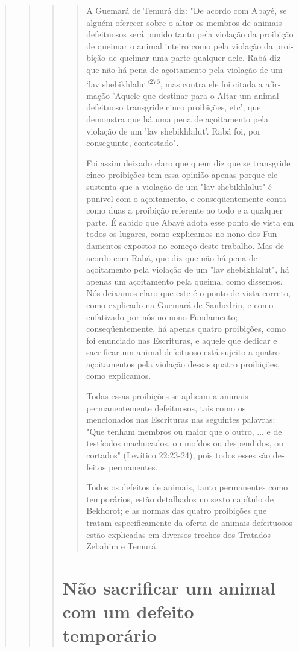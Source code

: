 \begin{quote}
\begin{quote}
\begin{quote}
\begin{quote}
A Guemará de Temurá diz: "De acordo com Abayé, se alguém ofe­recer sobre
o altar os membros de animais defeituosos será punido tanto pela
violação da proibição de queimar o animal inteiro como pela violação da
proi­bição de queimar uma parte qualquer dele. Rabá diz que não há pena
de açoita­mento pela violação de um `lav
shebikhlalut'\textsuperscript{276}, mas contra ele foi citada a
afir­mação 'Aquele que destinar para o Altar um animal defeituoso
transgride cinco proibições, etc', que demonstra que há uma pena de
açoitamento pela violação de um 'lav shebikhlalut'. Rabá foi, por
conseguinte, contestado".

Foi assim deixado claro que quem diz que se transgride cinco proi­bições
tem essa opinião apenas porque ele sustenta que a violação de um "lav
shebikhlalut" é punível com o açoitamento, e conseqüentemente conta como
duas a proibição referente ao todo e a qualquer parte. É sabido que
Abayé ado­ta esse ponto de vista em todos os lugares, como explicamos no
nono dos Fun­damentos expostos no começo deste trabalho. Mas de acordo
com Rabá, que diz que não há pena de açoitamento pela violação de um
"lav shebikhlalut", há apenas um açoitamento pela queima, como dissemos.
Nós deixamos claro que este é o ponto de vista correto, como explicado
na Guemará de Sanhedrin, e como enfatizado por nós no nono Fundamento;
conseqüentemente, há ape­nas quatro proibições, como foi enunciado nas
Escrituras, e aquele que dedicar e sacrificar um animal defeituoso está
sujeito a quatro açoitamentos pela viola­ção dessas quatro proibições,
como explicamos.

Todas essas proibições se aplicam a animais permanentemente
de­feituosos, tais como os mencionados nas Escrituras nas seguintes
palavras: "Que tenham membros ou maior que o outro, ... e de testículos
machucados, ou moí­dos ou despendidos, ou cortados" (Levítico 22:23-24),
pois todos esses são de­feitos permanentes.

Todos os defeitos de animais, tanto permanentes como temporários, estão
detalhados no sexto capítulo de Bekhorot; e as normas das quatro
proibi­ções que tratam especificamente da oferta de animais defeituosos
estão expli­cadas em diversos trechos dos Tratados Zebahim e Temurá.
\end{quote}

\section{Não sacrificar um animal com um defeito temporário}


\end{quote}
\end{quote}
\end{quote}
